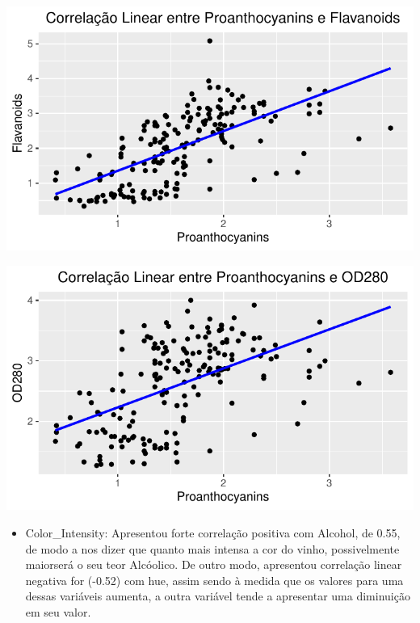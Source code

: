 \documentclass[
  letterpaper,
  DIV=11,
  numbers=noendperiod]{scrartcl}
\providecommand{\tightlist}{%
  \setlength{\itemsep}{0pt}\setlength{\parskip}{0pt}}\usepackage{longtable,booktabs,array}
\begin{document}
\begin{center}
\includegraphics{wines_analysis_files/figure-pdf/unnamed-chunk-13-2.pdf}
\end{center}

\begin{center}
\includegraphics{wines_analysis_files/figure-pdf/unnamed-chunk-13-3.pdf}
\end{center}

\begin{itemize}
\tightlist
\item
  Color\_Intensity: Apresentou forte correlação positiva com Alcohol, de
  0.55, de modo a nos dizer que quanto mais intensa a cor do vinho,
  possivelmente maiorserá o seu teor Alcóolico. De outro modo,
  apresentou correlação linear negativa for (-0.52) com hue, assim sendo
  à medida que os valores para uma dessas variáveis aumenta, a outra
  variável tende a apresentar uma diminuição em seu valor.
\end{itemize}
\end{document}
